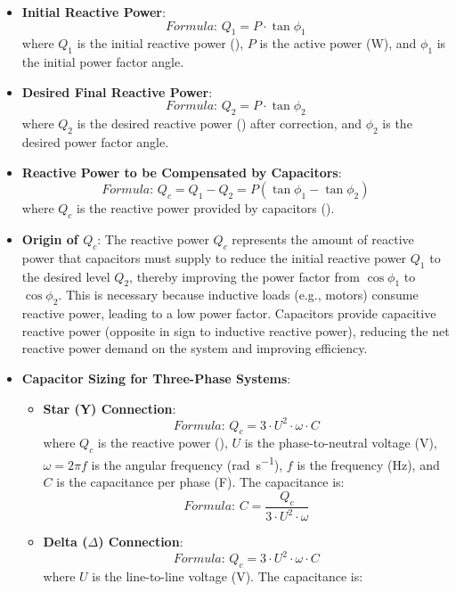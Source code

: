 \documentclass[12pt]{article}
\newcommand{\formula}[1]{\textit{Formula: }#1}
\begin{document}
\begin{itemize}
    \item \textbf{Initial Reactive Power}:
        \[
        \formula{Q_1 = P \cdot \tan \phi_1}
        \]
        where \(Q_1\) is the initial reactive power (\si{\voltampereactive}), \(P\) is the active power (\si{\watt}), and \(\phi_1\) is the initial power factor angle.
    \item \textbf{Desired Final Reactive Power}:
        \[
        \formula{Q_2 = P \cdot \tan \phi_2}
        \]
        where \(Q_2\) is the desired reactive power (\si{\voltampereactive}) after correction, and \(\phi_2\) is the desired power factor angle.
    \item \textbf{Reactive Power to be Compensated by Capacitors}:
        \[
        \formula{Q_c = Q_1 - Q_2 = P (\tan \phi_1 - \tan \phi_2)}
        \]
        where \(Q_c\) is the reactive power provided by capacitors (\si{\voltampereactive}).
    \item \textbf{Origin of \(Q_c\)}: The reactive power \(Q_c\) represents the amount of reactive power that capacitors must supply to reduce the initial reactive power \(Q_1\) to the desired level \(Q_2\), thereby improving the power factor from \(\cos \phi_1\) to \(\cos \phi_2\). This is necessary because inductive loads (e.g., motors) consume reactive power, leading to a low power factor. Capacitors provide capacitive reactive power (opposite in sign to inductive reactive power), reducing the net reactive power demand on the system and improving efficiency.
    \item \textbf{Capacitor Sizing for Three-Phase Systems}:
        \begin{itemize}
            \item \textbf{Star (Y) Connection}:
                \[
                \formula{Q_c = 3 \cdot U^2 \cdot \omega \cdot C}
                \]
                where \(Q_c\) is the reactive power (\si{\voltampereactive}), \(U\) is the phase-to-neutral voltage (\si{\volt}), \(\omega = 2 \pi f\) is the angular frequency (\si{\radian\per\second}), \(f\) is the frequency (\si{\hertz}), and \(C\) is the capacitance per phase (\si{\farad}). The capacitance is:
                \[
                \formula{C = \frac{Q_c}{3 \cdot U^2 \cdot \omega}}
                \]
            \item \textbf{Delta (\(\Delta\)) Connection}:
                \[
                \formula{Q_c = 3 \cdot U^2 \cdot \omega \cdot C}
                \]
                where \(U\) is the line-to-line voltage (\si{\volt}). The capacitance is:

\end{itemize}
\end{itemize}
\end{document}
